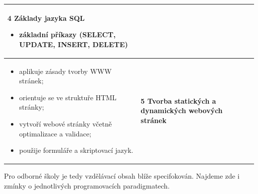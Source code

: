 \documentclass[FP,DP]{tulthesis}
\begin{document}
{{\begin{table}[ht]
\begin{tabular}{|l|l|}
\begin{minipage}[t]{0.45\textwidth}
\textbf{4 Základy jazyka SQL}
    \begin{itemize}[leftmargin=*,nosep]
  \item základní příkazy (SELECT, UPDATE, INSERT, DELETE)
\end{itemize}
  \end{minipage}\\\hline
  \begin{minipage}[t]{0.45\textwidth}
\begin{itemize}[leftmargin=*,nosep]
  	\item aplikuje zásady tvorby WWW stránek; 
	\item orientuje se ve struktuře HTML stránky;
  	\item vytvoří webové stránky včetně optimalizace a validace; 
	\item použije formuláře a skriptovací jazyk.
\end{itemize}
  \end{minipage} &
  \begin{minipage}[t]{0.45\textwidth}
\textbf{5 Tvorba statických a dynamických webových stránek }
  \end{minipage}\\\hline
\end{tabular}


\end{table}



Pro odborné školy je tedy vzdělávací obsah blíže specifokován. Najdeme zde i zmínky o jednotlivých programovacích paradigmatech. 


}}
\end{document}

